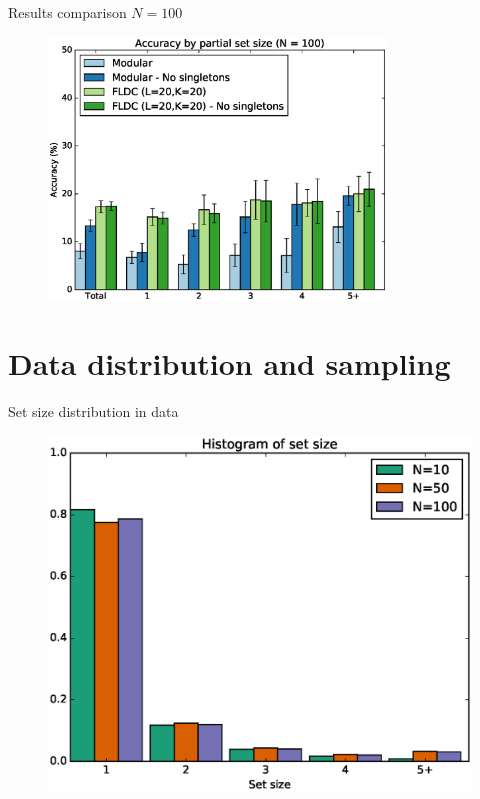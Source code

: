 \documentclass{beamer}
\begin{document}
\begin{frame}{Results comparison $N = 100$}
  \begin{figure}
    \centering
    \includegraphics[width=0.8\textwidth]{set_size_score_100_no_singletons}
  \end{figure}
\end{frame}

\section{Data distribution and sampling}

\begin{frame}{Set size distribution in data}
  \begin{figure}
    \centering
    \includegraphics[height=0.8\textheight]{data_size_histogram}
  \end{figure}
\end{frame}
\end{document}
